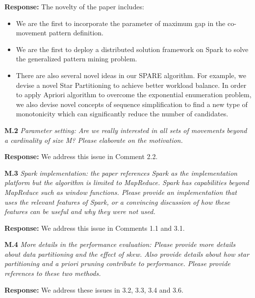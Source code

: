 \documentclass{vldb}
\newcommand{\eat}[1]{}
\begin{document}
\textbf{Response:} The novelty of the paper includes:
\begin{itemize}
\item We are the first to incorporate the parameter of maximum gap in the co-movement pattern definition.

\item We are the first to deploy a distributed solution framework on Spark to solve the generalized pattern mining problem.

\item There are also several novel ideas in our SPARE algorithm. For example, we devise a novel Star Partitioning to achieve better workload balance. In order to apply Apriori algorithm to overcome the exponential enumeration problem, we also devise novel concepts of sequence simplification to find a new type of monotonicity which can significantly reduce the number of candidates. 
\end{itemize}

\eat{

In addition to our response to comments 2.1, another novelty of our work lies in the 
techniques. 
Although the idea of star partition and apriori enumeration are well-known, 
linking them together to solve the problem in trajectory domain has not been attempted before.
Besides, we input heavy details on these algorithms (e.g., theoretical bounds of partition and
anti-monotonicity) which have not been previously proposed yet.
}


\textbf{M.2} \emph{Parameter setting: Are we really interested in all sets of movements beyond a cardinality of size M? Please elaborate
on the motivation.}

\textbf{Response:} We address this issue in Comment 2.2. 

\textbf{M.3} \emph{Spark implementation: the paper references Spark as the implementation platform but the algorithm is limited to MapReduce. Spark has capabilities beyond MapReduce such as window functions. Please provide an implementation that uses the relevant features of Spark, or a convincing discussion of how these features can be useful and why they were not used.}

\textbf{Response:} We address this issue in Comments 1.1 and 3.1.

\textbf{M.4} \emph{More details in the performance evaluation: Please provide more details about data partitioning and the effect of skew. Also provide details about how star partitioning and a priori pruning contribute to performance. Please provide references to these two methods.}

\textbf{Response:} We address these issues in 3.2, 3.3, 3.4 and 3.6.
\end{document}
